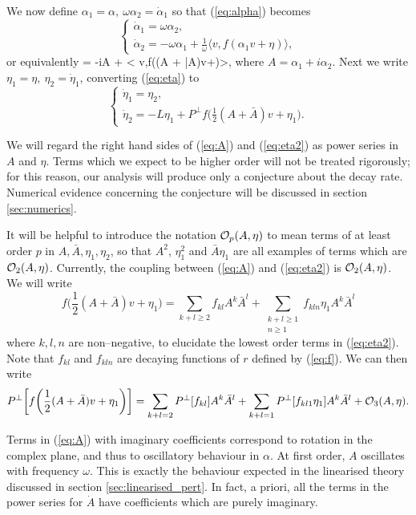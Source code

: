 We now define $\alpha_1=\alpha,\ \omega\alpha_2=\dot{\alpha}_1$  so that (\ref{eq:alpha}) becomes
\[
\begin{cases} \nonumber
\dot{\alpha}_1 = \omega\alpha_2, \\
\dot{\alpha}_2 = - \omega\alpha_1 + \frac{1}{\omega}\langle v, f(\alpha_1 v+\eta)\rangle,
\end{cases}
\]
or equivalently
\be \label{eq:A}
 = -i\omega A + \bigg< v,f\bigg((A + \bar{A})v+\eta\bigg)\bigg>,
\ee
where $A=\alpha_1 + i\alpha_2$. Next we write $\eta_1=\eta,\ \eta_2=\dot{\eta}_1$, converting (\ref{eq:eta}) to
\[ \label{eq:eta2}
\begin{cases}
\dot{\eta}_1 =\eta_2, \\
\dot{\eta}_2 = -L\eta_1 + P^\perp f\big( \frac{1}{2} (A+\bar{A}) v + \eta_1\big).
\end{cases}
\]

We will regard the right hand sides of (\ref{eq:A}) and (\ref{eq:eta2}) as power series in $A$ and $\eta$. Terms which we expect to be higher order will not be treated rigorously; for this reason, our analysis will produce only a conjecture about the decay rate. Numerical evidence concerning the conjecture will be discussed in section \ref{sec:numerics}.

It will be helpful to introduce the notation $\mathcal{O}_p(A,\eta)$ to mean terms of at least order $p$ in $A,\bar{A},\eta_1,\eta_2$, so that $A^2$, $\eta_1^2 $ and $\bar{A}\eta_1$ are all examples of terms which are $\mathcal{O}_2(A,\eta)$. Currently, the coupling between (\ref{eq:A}) and (\ref{eq:eta2}) is $\mathcal{O}_2(A,\eta)$. We will write
\[
f\bigg( \frac{1}{2} (A+\bar{A}) v + \eta_1\bigg) = \sum_{k+l\geq 2} f_{kl}A^k\bar{A}^l + \sum_{\substack{k+l\geq 1 \\ n\geq 1}} f_{kln}\eta_1A^k\bar{A}^l
\]
where $k,l,n$ are non--negative, to elucidate the lowest order terms in (\ref{eq:eta2}). Note that $f_{kl}$ and $f_{kln}$ are decaying functions of $r$ defined by (\ref{eq:f}). We can then write
\[
P^\perp\bigg[ f\bigg( \frac{1}{2} (A+\bar{A}) v + \eta_1\bigg) \bigg] = \sum_{k+l=2} P^\perp[f_{kl}]A^k\bar{A}^l + \sum_{k+l=1} P^\perp [f_{kl1}\eta_1]A^k\bar{A}^l + \mathcal{O}_3(A,\eta).
\]



Terms in (\ref{eq:A}) with imaginary coefficients correspond to rotation in the complex plane, and thus to oscillatory behaviour in $\alpha$. At first order, $A$ oscillates with frequency $\omega$. This is exactly the behaviour expected in the linearised theory discussed in section \ref{sec:linearised_pert}. In fact, a priori, all the terms in the power series for $\dot{A}$ have coefficients which are purely imaginary.

